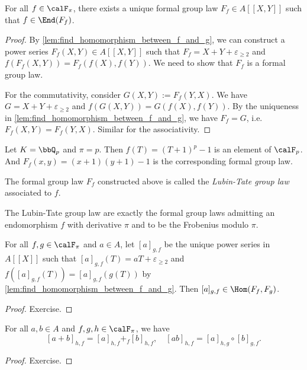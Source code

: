   \begin{proposition}
    For all $f \in \calF_\pi$, there exists a unique formal group law $F_f \in A[[X,Y]]$ such that $f \in \End(F_f)$.
  \end{proposition}
  \begin{proof}
    By \cref{lem:find_homomorphism_between_f_and_g}, we can construct a power series $F_f(X,Y) \in A[[X,Y]]$ such that $F_f = X + Y + \varepsilon_{\geq 2}$ and $f(F_f(X,Y)) = F_f(f(X),f(Y))$.
    We need to show that $F_f$ is a formal group law.

    For the commutativity, consider $G(X,Y) := F_f(Y,X)$.
    We have $G = X + Y + \varepsilon_{\geq 2}$ and $f(G(X,Y)) = G(f(X),f(Y))$.
    By the uniqueness in \cref{lem:find_homomorphism_between_f_and_g}, we have $F_f = G$, i.e. $F_f(X,Y) = F_f(Y,X)$.
    Similar for the associativity.

  \end{proof}

  \begin{example}
    Let $K = \bbQ_p$ and $\pi = p$.
    Then $f(T) = (T + 1)^p - 1$ is an element of $\calF_p$.
    And $F_f(x,y) = (x + 1)(y + 1) - 1$ is the corresponding formal group law.
  \end{example}

  \begin{definition}
    The formal group law $F_f$ constructed above is called the \emph{Lubin-Tate group law} associated to $f$.
  \end{definition}

  The Lubin-Tate group law are exactly the formal group laws admitting an endomorphism $f$ with derivative $\pi$ and to be the Frobenius modulo $\pi$.

  \begin{proposition}
    For all $f,g \in \calF_\pi$ and $a \in A$, let $[a]_{g,f}$ be the unique power series in $A[[X]]$ such that $[a]_{g,f}(T) = aT + \varepsilon_{\geq 2}$ and $f([a]_{g,f}(T)) = [a]_{g,f}(g(T))$ by \cref{lem:find_homomorphism_between_f_and_g}.
    Then $[a]_{g,f} \in \Hom(F_f,F_g)$.
  \end{proposition}
  \begin{proof}
    Exercise.
  \end{proof}

  \begin{proposition}\label{prop:operator_properties_of_a_g_f}
    For all $a,b \in A$ and $f,g,h \in \calF_\pi$, we have 
    \[ [a+b]_{h,f} = [a]_{h,f} +_f [b]_{h,f}, \quad [ab]_{h,f} = [a]_{h,g} \circ [b]_{g,f}. \]
  \end{proposition}
  \begin{proof}
    Exercise.
  \end{proof}

